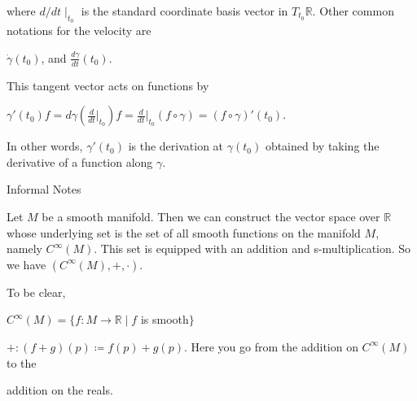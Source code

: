 \documentclass[12pt, a4paper]{article}
\begin{document}
where $d/dt\mid_{t_0}$ is the standard coordinate basis vector in $T_{t_0}\mathbb{R}$. Other common notations for the velocity are\par

\vspace{4mm}

\centerline{\large{$\dot{\gamma}(t_0)$}, and \large{$\frac{d\gamma}{dt}(t_0)$}.}

\vspace{6mm}

This tangent vector acts on functions by\par

\vspace{6mm}

\centerline{\large{$\gamma'(t_0)f=d\gamma(\tfrac{d}{dt}\Big|_{t_0})f=
\tfrac{d}{dt}\Big|_{t_0} (f\circ\gamma)=(f\circ\gamma)'(t_0)$}.}

\vspace{6mm}

In other words, $\gamma'(t_0)$ is the derivation at $\gamma(t_0)$ obtained by taking the derivative of a function along $\gamma$. 

\vspace{20mm}


\begin{flushleft}
\large{Informal Notes}
\end{flushleft}

\vspace{4mm}

Let $M$ be a smooth manifold. Then we can construct the vector space over $\mathbb{R}$ whose underlying set is the set of all smooth functions on the manifold $M$, namely $C^{\infty}(M)$. This set is equipped with an addition and s-multiplication. So we have $(C^{\infty}(M), +, \cdot)$.\par

\vspace{4mm}

To be clear,\par

\vspace{4mm}

\hspace{10mm}$C^{\infty}(M)=\{f\colon M\rightarrow\mathbb{R}\mid f$ is smooth$\}$\par

\vspace{4mm}

\hspace{10mm}$+\colon (f+g)(p)\coloneqq f(p)+g(p)$. Here you go from the addition on $C^{\infty}(M)$ to the\par
\hspace{10mm}addition on the reals.\par
\end{document}
